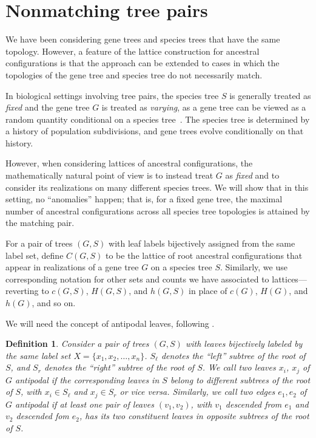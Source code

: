 \documentclass[10pt]{article}
\newtheorem{definition}[theorem]{Definition}%
\begin{document}
\clearpage 

\section{Nonmatching tree pairs}\label{sec:nonmatching}

We have been considering gene trees and species trees that have the same topology. However, a feature of the lattice construction for ancestral configurations is that the approach can be extended to cases in which the topologies of the gene tree and species tree do not necessarily match.

In biological settings involving tree pairs, the species tree $S$ is generally treated as \emph{fixed} and the gene tree $G$ is treated as \emph{varying}, as a gene tree can be viewed as a random quantity conditional on a species tree~\citep{degnanRosenberg2009}. The species tree is determined by a history of population subdivisions, and gene trees evolve conditionally on that history.

However, when considering lattices of ancestral configurations, the mathematically natural point of view is to instead treat $G$ as \emph{fixed} and to consider its realizations on many different species trees. We will show that in this setting, no ``anomalies'' happen; that is, for a fixed gene tree, the maximal number of ancestral configurations across all species tree topologies is attained by the matching pair. 

For a pair of trees $(G,S)$ with leaf labels bijectively assigned from the same label set, define $C(G,S)$ to be the lattice of root ancestral configurations that appear in realizations of a gene tree $G$ on a species tree $S$. Similarly, we use corresponding notation for other sets and counts we have associated to lattices---reverting to $c(G,S)$, $H(G,S)$, and $h(G,S)$ in place of $c(G)$, $H(G)$, and $h(G)$, and so on. 

We will need the concept of antipodal leaves, following \cite{rosenberg2019lonely}.

\begin{definition}
Consider a pair of trees $(G,S)$ with leaves bijectively labeled by the same label set $X = \{x_1,x_2,\ldots, x_n\}$. $S_\ell$ denotes the ``left'' subtree of the root of $S$, and $S_r$ denotes the ``right'' subtree of the root of $S$. We call two leaves $x_i$, $x_j$ of $G$ \emph{antipodal} if the corresponding leaves in $S$ belong to different subtrees of the root of $S$, with $x_i \in S_\ell$ and $x_j \in S_r$ or vice versa. Similarly, we call two edges $e_1,e_2$ of $G$ \emph{antipodal} if at least one pair of leaves $(v_1, v_2)$, with $v_1$ descended from $e_1$ and $v_2$ descended fom $e_2$, has its two constituent leaves in opposite subtrees of the root of $S$. 
\end{definition}
\end{document}

